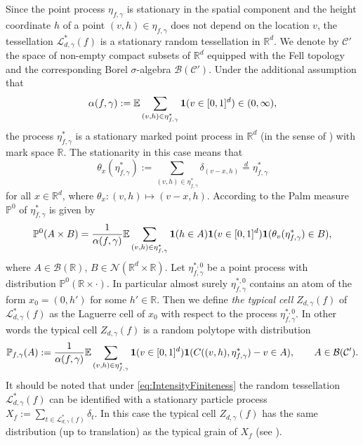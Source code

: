 \documentclass[11pt,a4paper]{article}
\theoremstyle{plain}
\theoremstyle{definition}
\theoremstyle{remark}
\def\EE{\mathbb{E}}
\def\PP{\mathbb{P}}
\def\RR{\mathbb{R}}
\def\cB{\mathcal{B}}
\def\cC{\mathcal{C}}
\def\cL{\mathcal{L}}
\def\cN{\mathcal{N}}
\begin{document}
Since the point process $\eta_{f,\gamma}$ is stationary in the spatial component and the height coordinate $h$ of a point $(v,h)\in \eta_{f,\gamma}$ does not depend on the location $v$, the tessellation $\cL^*_{d,\gamma}(f)$ is a stationary random tessellation in $\RR^d$. We denote by $\cC'$ the space of non-empty compact subsets of $\RR^d$ equipped with the Fell topology and the corresponding Borel $\sigma$-algebra $\cB(\cC')$. Under the additional assumption that
\begin{equation}\label{eq:IntensityFiniteness}
    \alpha(f,\gamma):=\EE \sum_{(v,h)\in \eta^*_{f,\gamma}}{{\bf 1}}(v\in[0,1]^d)\in (0,\infty),
\end{equation}
the process $\eta_{f,\gamma}^*$ is a stationary marked point process in $\RR^d$ (in the sense of \cite[Definition 3.5.1]{SW}) with mark space $\RR$. The stationarity in this case means that 
$$
    \theta_x(\eta_{f,\gamma}^*):=\sum_{(v,h)\in \eta_{f,\gamma}^*}\delta_{(v-x,h)}\overset{d}{=}\eta_{f,\gamma}^*
$$
for all $x\in\RR^d$, where $\theta_x:(v,h)\mapsto (v-x,h)$. According to \cite[Theorem 3.5.2]{SW} the Palm measure $\PP^0$ of $\eta_{f,\gamma}^*$ is given by
$$
    \PP^0(A\times B)={1\over \alpha(f,\gamma)}\EE\sum_{(v,h)\in \eta^*_{f,\gamma}}{{\bf 1}}(h\in A){\bf 1}(v\in[0,1]^d){\bf 1} (\theta_v(\eta_{f,\gamma}^*)\in B),
$$
where $A\in \cB(\RR),\, B\in \cN(\RR^d\times \RR)$. Let $\eta^{*,0}_{f,\gamma}$ be a point process with distribution $\PP^0(\RR\times \cdot)$. In particular almost surely
$\eta^{*,0}_{f,\gamma}$ contains an atom of the form $x_0=(0,h')$ for some $h'\in \RR$. Then we define \textit{the typical cell} $Z_{d,\gamma}(f)$ of $\cL^*_{d,\gamma}(f)$ as the Laguerre cell of $x_0$ with respect to the process $\eta^{*,0}_{f,\gamma}$. In other words the typical cell $Z_{d,\gamma}(f)$ is a random polytope with distribution
\[
  \PP_{f,\gamma}(A):=\frac{1}{\alpha(f,\gamma)} \EE \sum_{(v,h)\in \eta^*_{f,\gamma}} {\bf 1}(v\in[0,1]^d){\bf 1}(C((v,h),\eta^*_{f,\gamma})-v\in A),  \qquad A\in \cB(\cC').
\] 
It should be noted that under \eqref{eq:IntensityFiniteness} the random tessellation $\cL^*_{d,\gamma}(f)$ can be identified with a stationary particle process $X_f:=\sum_{t\in \cL^*_{d,\gamma}(f)}\delta_t$. In this case the typical cell $Z_{d,\gamma}(f)$ has the same distribution (up to translation) as the typical grain of $X_f$ (see \cite[Section 4.1 - 4.2]{SW}).
\end{document}
